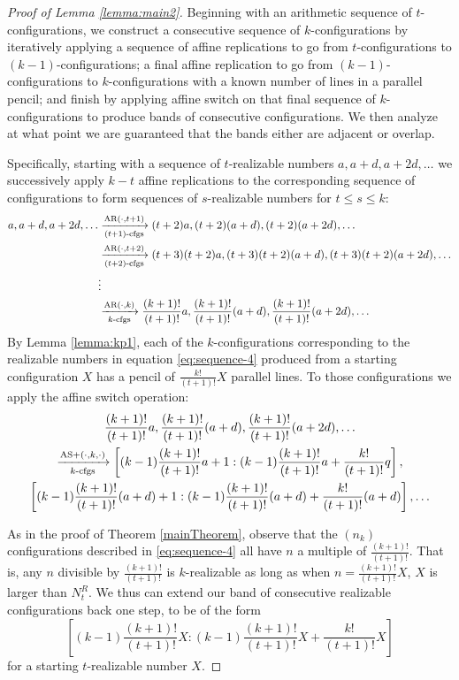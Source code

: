 \documentclass[reqno,12pt]{amsart}
\theoremstyle{plain}
\theoremstyle{definition}
\theoremstyle{remark}
\begin{document}
\begin{proof}[Proof of Lemma \ref{lemma:main2}]
Beginning with an arithmetic sequence of $t$-configurations, we construct a consecutive sequence of $k$-configurations 
by iteratively applying a sequence of affine replications to go from $t$-configurations to $(k-1)$-configurations; a final affine 
replication to go from  $(k-1)$-configurations to $k$-configurations with a known number of lines in a parallel pencil; and finish 
by applying affine switch on that final sequence of $k$-configurations to produce bands of consecutive configurations. We then
analyze at what point we are guaranteed that the bands either are adjacent or overlap.

Specifically, starting with a sequence of $t$-realizable numbers $a, a+d, a+2d, \ldots$ we successively apply $k-t$ affine replications 
to the corresponding sequence of configurations to form sequences of $s$-realizable numbers for $t \leq s \leq k$:
%
\begin{align}
a, a+d, a+2d, \ldots  &\xrightarrow[(t+1)\text{-cfgs}]{ \mathrm{AR}(\cdot, t+1)} (t+2)a, (t+2)(a+d), (t+2)(a+2d), \ldots  \nonumber
\\
 &\xrightarrow[(t+2)\text{-cfgs}]{ \mathrm{AR}( \cdot, t+2)} (t+3)(t+2)a, (t+3)(t+2)(a+d), (t+3)(t+2)(a+2d), \ldots \nonumber \\
&\vdots \nonumber\\
&\xrightarrow[k\text{-cfgs}]{ \mathrm{AR}( \cdot, k)} \frac{(k+1)!}{(t+1)!}a, \frac{(k+1)!}{(t+1)!}(a+d), \frac{(k+1)!}{(t+1)!}(a+2d), \ldots  \label{eq:sequence-4}
\end{align}
%
By Lemma \ref{lemma:kp1}, each of the $k$-configurations corresponding to the realizable numbers in equation \eqref{eq:sequence-4} 
produced from a starting configuration $X$ has a pencil of  $\frac{k!}{(t+1)!}X$ parallel lines. To those configurations we apply 
the affine switch operation:
%
\begin{multline}
\frac{(k+1)!}{(t+1)!}a, \frac{(k+1)!}{(t+1)!}(a+d), \frac{(k+1)!}{(t+1)!}(a+2d), \ldots \\ 
\xrightarrow[k\text{-cfgs}]{ \mathrm{AS+}(\cdot, k, \cdot)} \left[(k-1)\frac{(k+1)!}{(t+1)!}a+1: (k-1)\frac{(k+1)!}{(t+1)!}a+\frac{k!}{(t+1)!}q\right], \\ 
\left[(k-1)\frac{(k+1)!}{(t+1)!}(a+d)+1: (k-1)\frac{(k+1)!}{(t+1)!}(a+d)+\frac{k!}{(t+1)!}(a+d)\right], \ldots \label{eq:finalBands}
\end{multline}

As in the proof of Theorem \ref{mainTheorem}, observe that the $(n_{k})$ configurations described in \eqref{eq:sequence-4} 
all have $n$ a multiple of $\frac{(k+1)!}{(t+1)!}$. That is, any $n$ divisible by $\frac{(k+1)!}{(t+1)!}$ is $k$-realizable as long 
as when $n = \frac{(k+1)!}{(t+1)!}X$, $X$ is larger than $N^{R}_{t}$. We thus can extend our band of consecutive realizable 
configurations back one step, to be of the form
\[ \left[(k-1)\frac{(k+1)!}{(t+1)!}X: (k-1)\frac{(k+1)!}{(t+1)!}X+\frac{k!}{(t+1)!}X\right]\]
for a starting $t$-realizable number $X$. 


\end{proof}
\end{document}
